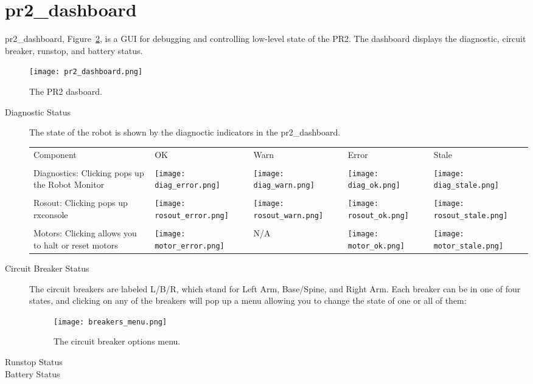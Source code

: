 \section{pr2\_dashboard}
pr2\_dashboard, Figure~\ref{fig:dashboard}, is a GUI for debugging and controlling low-level state of the PR2. The dashboard displays the diagnostic, 
circuit breaker, runstop, and battery status.
\begin{figure}[h]
\centering
\texttt{[image: pr2\_dashboard.png]}
\caption{The PR2 dasboard.}
\label{fig:dashboard}
\end{figure}
\begin{description}
\item[Diagnostic Status] The state of the robot is shown by the diagnoctic indicators in the pr2\_dashboard. \\

    \begin{tabular}{m{6cm}SSSS}
    Component & OK & Warn & Error & Stale\\
    &&&&\\
    Diagnostics: Clicking pops up the Robot Monitor & \texttt{[image: diag\_error.png]}&\texttt{[image: diag\_warn.png]}&
                                                      \texttt{[image: diag\_ok.png]}&\texttt{[image: diag\_stale.png]}\\
    &&&&\\
    Rosout: Clicking pops up rxconsole & \texttt{[image: rosout\_error.png]}&\texttt{[image: rosout\_warn.png]}&
                                        \texttt{[image: rosout\_ok.png]}&\texttt{[image: rosout\_stale.png]}\\
    &&&&\\
    Motors: Clicking allows you to halt or reset motors & \texttt{[image: motor\_error.png]}& N/A &
                                                          \texttt{[image: motor\_ok.png]}&\texttt{[image: motor\_stale.png]}\\
   \end{tabular}

\item[Circuit Breaker Status] The circuit breakers are labeled L/B/R, which stand for Left Arm, Base/Spine, and Right Arm. 
Each breaker can be in one of four states, and clicking on any of the breakers will pop up a menu allowing you to change 
the state of one or all of them:
\begin{figure}[h]
\centering
\texttt{[image: breakers\_menu.png]}
\caption{The circuit breaker options menu.}
\label{fig:dashboard}
\end{figure}



\item[Runstop Status]

\item[Battery Status]

\end{description}

